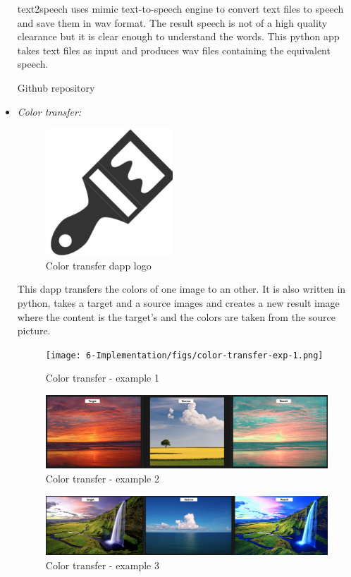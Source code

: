 \begin{itemize}
        text2speech uses mimic text-to-speech engine to convert text files to speech and save them
        in wav format. The result speech is not of a high quality clearance but it is clear enough
        to understand the words. This python app takes text files as input and produces wav files
        containing the equivalent speech.

        Github repository\cite{text-to-speech}

        \item \textit{Color transfer: }

        \begin{figure}[!h]\centering
            \includegraphics[width=.2\columnwidth]{6-Implementation/figs/color-transfer-logo.png}
            \caption{Color transfer dapp logo}
        \end{figure}

        This dapp transfers the colors of one image to an other. It is also written in python,
        takes a target and a source images and creates a new result image where the content is
        the target's and the colors are taken from the source picture.

        \clearpage

        \begin{figure}[!h]\centering
            \texttt{[image: 6-Implementation/figs/color-transfer-exp-1.png]}
            \caption{Color transfer - example 1}
        \end{figure}

        \begin{figure}[!h]\centering
            \includegraphics[width=\columnwidth]{6-Implementation/figs/color-transfer-exp-2.png}
            \caption{Color transfer - example 2}
        \end{figure}

        \begin{figure}[!h]\centering
            \includegraphics[width=\columnwidth]{6-Implementation/figs/color-transfer-exp-3.png}
            \caption{Color transfer - example 3}
        \end{figure}



\end{itemize}
